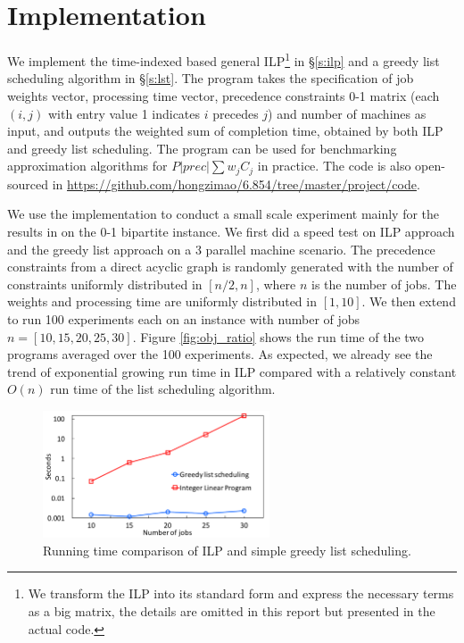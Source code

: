 \section{Implementation} \label{s:impl}
We implement the time-indexed based general ILP\footnote{We transform the ILP into its standard form and express the necessary terms as a big matrix, the details are omitted in this report but presented in the actual code.} in \S\ref{s:ilp} and a greedy list scheduling algorithm in \S\ref{s:lst}. The program takes the specification of job weights vector, processing time vector, precedence constraints 0-1 matrix (each $(i, j)$ with entry value 1 indicates $i$ precedes $j$) and number of machines as input, and outputs the weighted sum of completion time, obtained by both ILP and greedy list scheduling. The program can be used for benchmarking approximation algorithms for $P|prec|\sum w_j C_j$ in practice. The code is also open-sourced in \url{https://github.com/hongzimao/6.854/tree/master/project/code}.

We use the implementation to conduct a small scale experiment mainly for the results in \cite{schulz2011near} on the 0-1 bipartite instance. We first did a speed test on ILP approach and the greedy list approach on a 3 parallel machine scenario. The precedence constraints from a direct acyclic graph is randomly generated with the number of constraints uniformly distributed in $[n/2, n]$, where $n$ is the number of jobs. The weights and processing time are uniformly distributed in $[1, 10]$. We then extend to run 100 experiments each on an instance with number of jobs $n = [10, 15, 20, 25, 30]$. Figure \ref{fig:obj_ratio} shows the run time of the two programs averaged over the 100 experiments. As expected, we already see the trend of exponential growing run time in ILP compared with a relatively constant $O(n)$ run time of the list scheduling algorithm.

\begin{figure}[h]
	\centering
	\includegraphics[width=0.6\textwidth]{figs/runtime.pdf}
	\caption{Running time comparison of ILP and simple greedy list scheduling.}
	\label{fig:runtime}
\end{figure}

